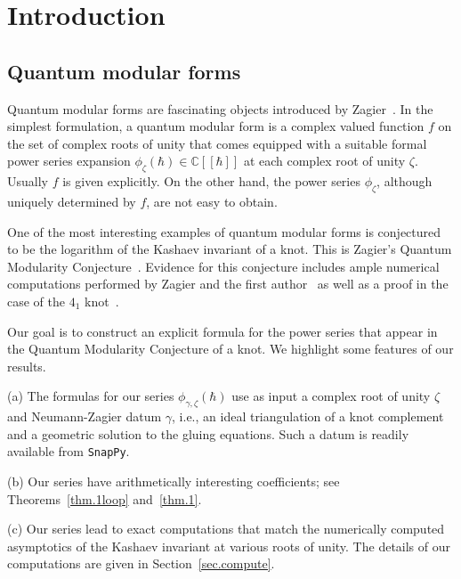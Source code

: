 \documentclass[12pt]{amsart}
\theoremstyle{definition}
\def\BC{\mathbb C}
\begin{document}
\maketitle

\tableofcontents

\section{Introduction}
\label{sec.intro}

\subsection{Quantum modular forms}
\label{sub.QMF}

Quantum modular forms are fascinating objects introduced by 
Zagier~\cite{Za:QMF}. In the simplest formulation, a quantum modular form is a 
complex valued function $f$ on the set of complex roots of 
unity that comes equipped with a suitable formal power series expansion  
$\phi_\zeta(\hbar) \in \BC[\![\hbar]\!]$ at each complex root of unity $\zeta$.
Usually $f$ is given explicitly.
On the other hand, the power series $\phi_\zeta$,
although uniquely determined by $f$, are not easy to obtain.

One of the most interesting examples of quantum modular forms is conjectured
to be the logarithm of the Kashaev invariant of a knot. This 
is Zagier's Quantum Modularity Conjecture~\cite{Za:QMF}. 
Evidence for this conjecture includes ample numerical computations performed by 
Zagier and the first author~\cite{GZ1} as well as a proof in the case of the
$4_1$ knot~\cite{GZ1}. 


Our goal is to construct an explicit formula for 
the power series that appear in the Quantum Modularity Conjecture of a knot.
We highlight some features of our results. 

\noindent
\rm{(a)}
The formulas for our series $\phi_{\gamma,\zeta}(\hbar)$ use as input 
a complex root of unity $\zeta$ and Neumann-Zagier datum $\gamma$, 
i.e., an ideal triangulation of a knot complement and a geometric solution 
to the gluing equations. Such a datum is readily available from {\tt SnapPy}.

\noindent
\rm{(b)}
Our series have arithmetically interesting coefficients;
see Theorems~\ref{thm.1loop} and~\ref{thm.1}.

\noindent
\rm{(c)}
Our series lead to exact computations that match the numerically computed
asymptotics of the Kashaev invariant at various roots of unity. The details
of our computations are given in Section~\ref{sec.compute}. 
\end{document}
